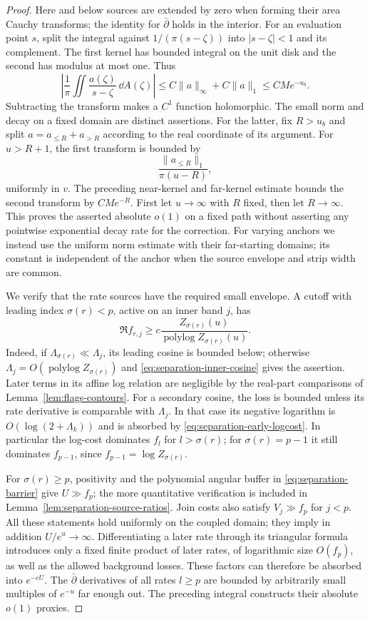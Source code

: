 \begin{proof}
Here and below sources are extended by zero when forming their
area Cauchy transforms; the identity for $\bar\partial$ holds in
the interior.  For an evaluation point $s$, split the integral
against $1/(\pi(s-\zeta))$ into $|s-\zeta|<1$ and its complement.
The first kernel has bounded integral on the unit disk and the
second has modulus at most one.  Thus
\[
 \left|\frac1\pi\iint
        \frac{a(\zeta)}{s-\zeta}\,\dd A(\zeta)\right|
 \leq C\|a\|_\infty+C\|a\|_1
 \leq C M e^{-u_b}.
\]
Subtracting the transform makes a $C^1$ function holomorphic.
The small norm and decay on a fixed domain are distinct assertions.
For the latter, fix $R>u_b$ and split $a=a_{\leq R}+a_{>R}$
according to the real coordinate of its argument.  For $u>R+1$,
the first transform is bounded by
\[
 \frac{\|a_{\leq R}\|_1}{\pi(u-R)},
\]
uniformly in $v$.  The preceding near-kernel and far-kernel
estimate bounds the second transform by $CM e^{-R}$.
First let $u\to\infty$ with $R$ fixed, then let $R\to\infty$.
This proves the asserted absolute $o(1)$ on a fixed path without
asserting any pointwise exponential decay rate for the correction.
For varying anchors we instead use the uniform norm estimate
with their far-starting domains; its constant is independent of
the anchor when the source envelope and strip width are common.

We verify that the rate sources have the required small envelope.
A cutoff with leading index $\sigma(r)<p$, active on an inner
band $j$, has
\begin{equation}\label{eq:separation-early-logcost}
 \Re f_{r,j}\geq
 c\frac{Z_{\sigma(r)}(u)}{\operatorname{polylog}Z_{\sigma(r)}(u)}.
\end{equation}
Indeed, if $\Lambda_{\sigma(r)}\ll\Lambda_j$, its leading
cosine is bounded below; otherwise
$\Lambda_j=O(\operatorname{polylog}Z_{\sigma(r)})$ and
\eqref{eq:separation-inner-cosine} gives the assertion.
Later terms in its affine log relation are negligible by the
real-part comparisons of Lemma~\ref{lem:flags-contours}.
For a secondary cosine, the loss is bounded unless its rate
derivative is comparable with $\Lambda_j$.  In that case its
negative logarithm is $O(\log(2+\Lambda_k))$ and is absorbed by
\eqref{eq:separation-early-logcost}.  In particular the log-cost
dominates $f_l$ for $l>\sigma(r)$; for $\sigma(r)=p-1$ it
still dominates $f_{p-1}$, since
$f_{p-1}=\log Z_{\sigma(r)}$.

For $\sigma(r)\geq p$, positivity and the polynomial angular
buffer in \eqref{eq:separation-barrier} give $U\gg f_p$;
the more quantitative verification is included in
Lemma~\ref{lem:separation-source-ratios}.  Join costs also satisfy
$V_j\gg f_p$ for $j<p$.  All these statements hold uniformly
on the coupled domain; they imply in addition $U/e^u\to\infty$.
Differentiating a later rate through its triangular formula
introduces only a fixed finite product of later rates, of
logarithmic size $O(f_p)$, as well as the allowed background
losses.  These factors can therefore be absorbed into $e^{-cU}$.
The $\bar\partial$ derivatives of all rates $l\geq p$ are bounded
by arbitrarily small multiples of $e^{-u}$ far enough out.
The preceding integral constructs their absolute $o(1)$ proxies.


\end{proof}
